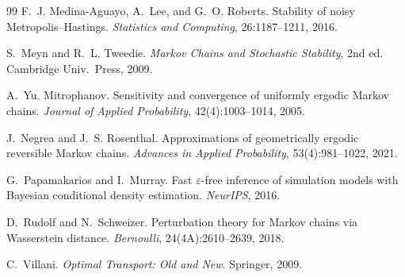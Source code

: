 \documentclass[11pt]{article}
\theoremstyle{plain}
\theoremstyle{definition}
\theoremstyle{remark}
\begin{document}
\begin{thebibliography}{99}
F.~J. Medina-Aguayo, A.~Lee, and G.~O. Roberts.
Stability of noisy Metropolis--Hastings.
\emph{Statistics and Computing}, 26:1187--1211, 2016.

S.~Meyn and R.~L. Tweedie.
\emph{Markov Chains and Stochastic Stability}, 2nd ed. Cambridge Univ.\ Press, 2009.

A.~Yu. Mitrophanov.
Sensitivity and convergence of uniformly ergodic Markov chains.
\emph{Journal of Applied Probability}, 42(4):1003--1014, 2005.

J.~Negrea and J.~S. Rosenthal.
Approximations of geometrically ergodic reversible Markov chains.
\emph{Advances in Applied Probability}, 53(4):981--1022, 2021.

G.~Papamakarios and I.~Murray.
Fast $\varepsilon$-free inference of simulation models with Bayesian conditional density estimation.
\emph{NeurIPS}, 2016.

D.~Rudolf and N.~Schweizer.
Perturbation theory for Markov chains via Wasserstein distance.
\emph{Bernoulli}, 24(4A):2610--2639, 2018.

C.~Villani.
\emph{Optimal Transport: Old and New}. Springer, 2009.

\end{thebibliography}
\end{document}

